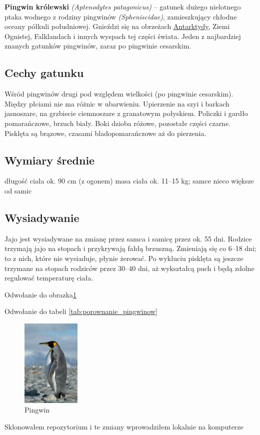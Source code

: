 \noindent \textbf{Pingwin królewski} \textit{(Aptenodytes patagonicus)} – gatunek dużego nielotnego ptaka wodnego z rodziny pingwinów \textit{(Spheniscidae)}, zamieszkujący chłodne oceany półkuli południowej. Gnieździ się na obrzeżach \underline{Antarktydy}, Ziemi Ognistej, Falklandach i innych wyspach tej części świata. Jeden z najbardziej znanych gatunków pingwinów, zaraz po pingwinie cesarskim.
\subsection*{Cechy gatunku}
Wśród pingwinów drugi pod względem wielkości (po pingwinie cesarskim). Między płciami nie ma różnic w ubarwieniu. Upierzenie na szyi i barkach jasnoszare, na grzbiecie ciemnoszare z granatowym połyskiem. Policzki i gardło pomarańczowe, brzuch biały. Boki dzioba różowe, pozostałe części czarne. Pisklęta są brązowe, czasami bladopomarańczowe aż do pierzenia.
\subsection*{Wymiary średnie}
długość ciała ok. 90 cm (z ogonem)
masa ciała ok. 11–15 kg; samce nieco większe od samic
\subsection*{Wysiadywanie}
Jajo jest wysiadywane na zmianę przez samca i samicę przez ok. 55 dni. Rodzice trzymają jajo na stopach i przykrywają fałdą brzuszną. Zmieniają się co 6–18 dni; to z nich, które nie wysiaduje, płynie żerować. Po wykluciu pisklęta są jeszcze trzymane na stopach rodziców przez 30–40 dni, aż wykształcą puch i będą zdolne regulować temperaturę ciała.

\noindent Odwołanie do obrazka\ref{fig:pingwin}

\noindent Odwołanie do tabeli \ref{tab:porownanie_pingwinow}


\begin{figure}[htbp]
    \centering
    \includegraphics[width=0.25\textwidth]{pictures/pingwin.jpg}
    \caption{Pingwin}
    \label{fig:pingwin}
\end{figure}

\noindent Sklonowałem repozytorium i te zmiany wprowadziłem lokalnie na komputerze